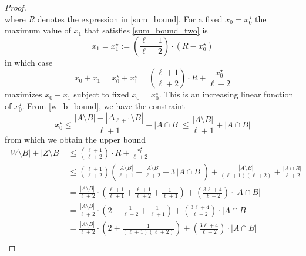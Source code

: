 \documentclass{patmorin}
\newcommand{\pat}[1]{\textcolor{Blue}{[Pat: #1]}}
\newcommand{\hussein}[1]{\textcolor{purple}{HH: #1}}
\begin{document}
\begin{proof}
\begin{equation}
  \end{equation}
  where $R$ denotes the expression in \eqref{sum_bound}.
  For a fixed $x_0=x^\star_0$ the maximum value of $x_1$ that satisfies \eqref{sum_bound_two} is 
  \[ 
    x_1 = x_1^\star:=\left(\frac{\ell+1}{\ell+2}\right)\cdot(R-x^{\star}_0)
  \]
  in which case 
  \[
     x_0 + x_1 = x^\star_0+x^\star_1 = \left(\frac{\ell+1}{\ell+2}\right)\cdot R + \frac{x^\star_0}{\ell+2} 
  \]
  maximizes $x_0+x_1$ subject to fixed $x_0=x_0^{\star}$.
  This is an increasing linear function of $x_0^{\star}$.  From \eqref{w_b_bound}, we have the constraint
  \[
     x_0^\star \le 
     \frac{|A\setminus B|-|\Delta_{\ell+1}\setminus B|}{\ell+1}+|A\cap B|
     \le \frac{|A\setminus B|}{\ell+1}+|A\cap B|
  \]
  from which we obtain the upper bound
  \begin{align*}
    |W\setminus B|+|Z\setminus B|
    & \le \left(\frac{\ell+1}{\ell+2}\right)\cdot R + 
    \frac{x_0^\star}{\ell+2} \\
    & \le \left(\frac{\ell+1}{\ell+2}\right)\left(\frac{|A\setminus B|}{\ell+1}+\frac{|A\setminus B|}{\ell+2}+3\,|A\cap B|\right)+\frac{|A\setminus B|}{(\ell+1)
    (\ell+2)}
    + \frac{|A\cap B|}{\ell+2}
    \\
    & = \frac{|A\setminus B|}{\ell+2}\cdot\left(\frac{\ell+1}{\ell+1}+\frac{\ell+1}{\ell+2}+\frac{1}{\ell+1}\right) +\left(\frac{3\ell+4}{\ell+2}\right)\cdot |A\cap B|  \\
    & = \frac{|A\setminus B|}{\ell+2}\cdot\left(2-\frac{1}{\ell+2}+\frac{1}{\ell+1}\right) +\left(\frac{3\ell+4}{\ell+2}\right)\cdot |A\cap B|  \\
    & = \frac{|A\setminus B|}{\ell+2}\cdot\left(2+\frac{1}{(\ell+1)(\ell+2)}\right) +\left(\frac{3\ell+4}{\ell+2}\right)\cdot |A\cap B|  \\

\end{align*}
\end{proof}
\end{document}
